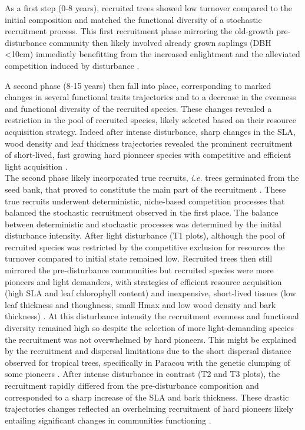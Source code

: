 \documentclass[fleqn,10pt]{ArtEcoFoG} %
\begin{document}
As a first step (0-8 years), recruited trees showed low turnover
compared to the initial composition and matched the functional diversity
of a stochastic recruitment process. This first recruitment phase
mirroring the old-growth pre-disturbance community then likely involved
already grown saplings (DBH \textless{}10cm) immediatly benefitting from
the increased enlightment and the alleviated competition induced by
disturbance \citep{Herault2010}.

A second phase (8-15 years) then fall into place, corresponding to
marked changes in several functional traits trajectories and to a
decrease in the evenness and functional diversity of the recruited
species. These changes revealed a restriction in the pool of recruited
species, likely selected based on their resource acquisition strategy.
Indeed after intense disturbance, sharp changes in the SLA, wood density
and leaf thickness trajectories revealed the prominent recruitment of
short-lived, fast growing hard pionneer species with competitive and
efficient light acquisition
\citep{Wright2004, Chave2009b, Herault2011, Reich2014}.\\
The second phase likely incorporated true recruits, \emph{i.e.} trees
germinated from the seed bank, that proved to constitute the main part
of the recruitment \citep{Lawton1988}. These true recruits underwent
deterministic, niche-based competition processes that balanced the
stochastic recruitment observed in the first place. The balance between
deterministic and stochastic processes was determined by the initial
disturbance intensity. After light disturbance (T1 plots), although the
pool of recruited species was restricted by the competitive exclusion
for resources the turnover compared to initial state remained low.
Recruited trees then still mirrored the pre-disturbance communities but
recruited species were more pioneers and light demanders, with
strategies of efficient resource acquisition (high SLA and leaf
chlorophyll content) and inexpensive, short-lived tissues (low leaf
thickness and thoughness, small Hmax and low wood density and bark
thickness) \citep{Hubbell1999, Schnitzer2001, Sheil2003, Bongers2009}.
At this disturbance intensity the recruitment evenness and functional
diversity remained high so despite the selection of more light-demanding
species the recruitment was not overwhelmed by hard pioneers. This might
be explained by the recruitment and dispersal limitations due to the
short dispersal distance observed for tropical trees, specifically in
Paracou with the genetic clumping of some pioneers
\citep{Leclerc2015, Scotti2015a}. After intense disturbance in contrast
(T2 and T3 plots), the recruitment rapidly differed from the
pre-disturbance composition and corresponded to a sharp increase of the
SLA and bark thickness. These drastic trajectories changes reflected an
overhelming recruitment of hard pioneers likely entailing significant
changes in communities functioning \citep{Diaz2005}.
\end{document}
